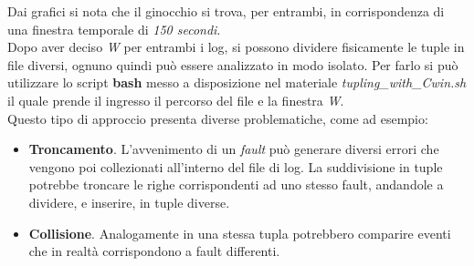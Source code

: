 Dai grafici si nota che il ginocchio si trova, per entrambi, in corrispondenza di una finestra temporale di \textit{150 secondi}. 
\\Dopo aver deciso \textit{W} per entrambi i log, si possono dividere fisicamente le tuple in file diversi, ognuno quindi può essere analizzato in modo isolato. Per farlo si può utilizzare lo script \textbf{bash} messo a disposizione nel materiale \textit{tupling\_with\_Cwin.sh} il quale prende il ingresso il percorso del file e la finestra \textit{W}.
\\Questo tipo di approccio presenta diverse problematiche, come ad esempio:
\begin{itemize}
	\item \textbf{Troncamento}. L'avvenimento di un \textit{fault} può generare diversi errori che vengono poi collezionati all'interno del file di log. La suddivisione in tuple potrebbe troncare le righe corrispondenti ad uno stesso fault, andandole a dividere, e inserire, in tuple diverse. 
	\item \textbf{Collisione}. Analogamente in una stessa tupla potrebbero comparire eventi che in realtà corrispondono a fault differenti.
\end{itemize} 

